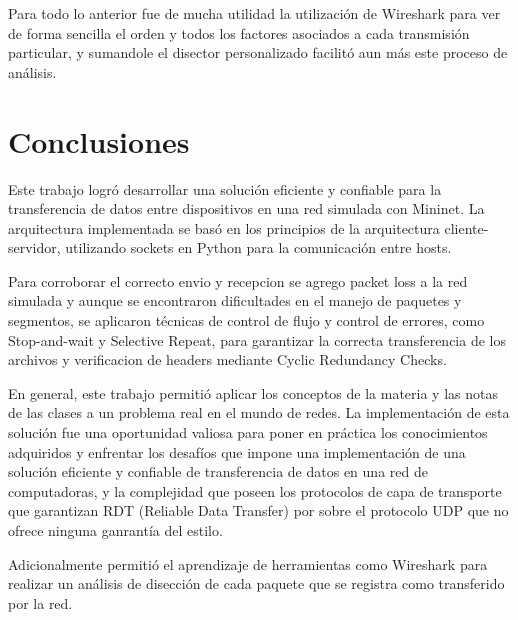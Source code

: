 \documentclass[11pt,a4paper]{article}
\begin{document}
Para todo lo anterior fue de mucha utilidad la utilización de Wireshark para ver de forma sencilla el orden y todos los factores asociados a cada transmisión particular, y sumandole el disector personalizado facilitó aun más este proceso de análisis.


\newpage

\section{Conclusiones}
Este trabajo logró desarrollar una solución eficiente y confiable para la transferencia de datos entre dispositivos en una red simulada con Mininet. La arquitectura implementada se basó en los principios de la arquitectura cliente-servidor, utilizando sockets en Python para la comunicación entre hosts.

Para corroborar el correcto envio y recepcion se agrego packet loss a la red simulada 
y aunque se encontraron dificultades en el manejo de paquetes y segmentos, se aplicaron técnicas de control de flujo y control de errores, como Stop-and-wait y Selective Repeat, para garantizar la correcta transferencia de los archivos y verificacion de headers mediante Cyclic Redundancy Checks.

En general, este trabajo permitió aplicar los conceptos de la materia y las notas de las clases a un problema real en el mundo de redes. La implementación de esta solución fue una oportunidad valiosa para poner en práctica los conocimientos adquiridos y enfrentar los desafíos que impone una implementación de una solución eficiente y confiable de transferencia de datos en una red de computadoras, y la complejidad que poseen los protocolos de capa de transporte que garantizan RDT (Reliable Data Transfer) por sobre el protocolo UDP que no ofrece ninguna ganrantía del estilo.


Adicionalmente permitió el aprendizaje de herramientas como Wireshark para realizar un análisis de disección de cada paquete que se registra como transferido por la red.



\end{document}

